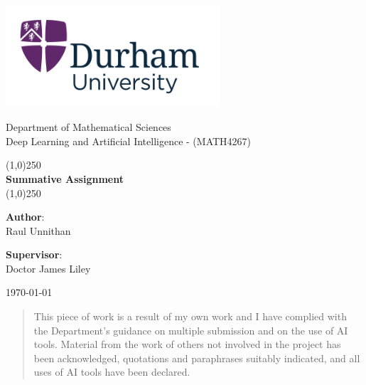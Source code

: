 \documentclass[11pt]{report} %
\begin{document}
\begin{titlepage}
    \begin{center} 
        \hfill \break
         \vspace{5mm}
         
        \includegraphics[width=0.6\textwidth]{Durham_Uni_Name.png}   
       
        \vspace{1cm}
        \LARGE
            Department of Mathematical Sciences \\
            Deep Learning and Artificial Intelligence - (MATH4267)
        
        \linethickness{0.5mm}
        \Huge
            \line(1,0){250}\\
            \textbf{Summative Assignment}\\
            \line(1,0){250}
        
    \end{center}  

    \begin{minipage}[t]{0.47\textwidth}\centering
        {\Large \textbf{Author}:\\
        Raul Unnithan}\\
    \end{minipage}
    \hfill
    \begin{minipage}[t]{0.47\textwidth}\centering
        {\Large \textbf{Supervisor}:\\
        Doctor James Liley}
    \end{minipage}

    \vfill  %

    \begin{center}
        \large \today  
    \end{center}
    
\end{titlepage}


\begin{abstract}
This piece of work is a result of my own work and I have complied with the Department’s guidance on multiple submission and on the use of AI tools. Material from the work of others not involved in the project has been acknowledged, quotations and paraphrases suitably indicated, and all uses of AI tools have been declared.
\end{abstract}
\end{document}
